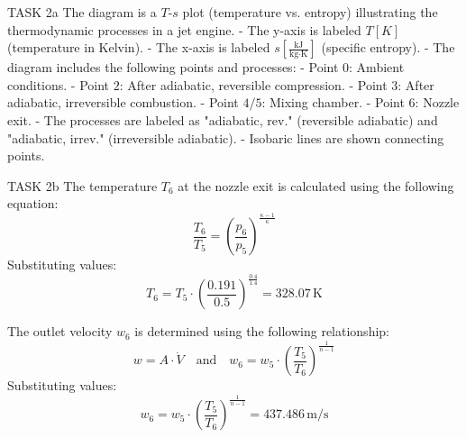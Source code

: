 TASK 2a  
The diagram is a \( T \)-\( s \) plot (temperature vs. entropy) illustrating the thermodynamic processes in a jet engine.  
- The y-axis is labeled \( T [K] \) (temperature in Kelvin).  
- The x-axis is labeled \( s [\frac{\text{kJ}}{\text{kg·K}}] \) (specific entropy).  
- The diagram includes the following points and processes:  
  - Point \( 0 \): Ambient conditions.  
  - Point \( 2 \): After adiabatic, reversible compression.  
  - Point \( 3 \): After adiabatic, irreversible combustion.  
  - Point \( 4/5 \): Mixing chamber.  
  - Point \( 6 \): Nozzle exit.  
- The processes are labeled as "adiabatic, rev." (reversible adiabatic) and "adiabatic, irrev." (irreversible adiabatic).  
- Isobaric lines are shown connecting points.  

TASK 2b  
The temperature \( T_6 \) at the nozzle exit is calculated using the following equation:  
\[
\frac{T_6}{T_5} = \left( \frac{p_6}{p_5} \right)^{\frac{\kappa - 1}{\kappa}}
\]  
Substituting values:  
\[
T_6 = T_5 \cdot \left( \frac{0.191}{0.5} \right)^{\frac{0.4}{1.4}} = 328.07 \, \text{K}
\]  

The outlet velocity \( w_6 \) is determined using the following relationship:  
\[
w = A \cdot \dot{V} \quad \text{and} \quad w_6 = w_5 \cdot \left( \frac{T_5}{T_6} \right)^{\frac{1}{n-1}}
\]  
Substituting values:  
\[
w_6 = w_5 \cdot \left( \frac{T_5}{T_6} \right)^{\frac{1}{n-1}} = 437.486 \, \text{m/s}
\]